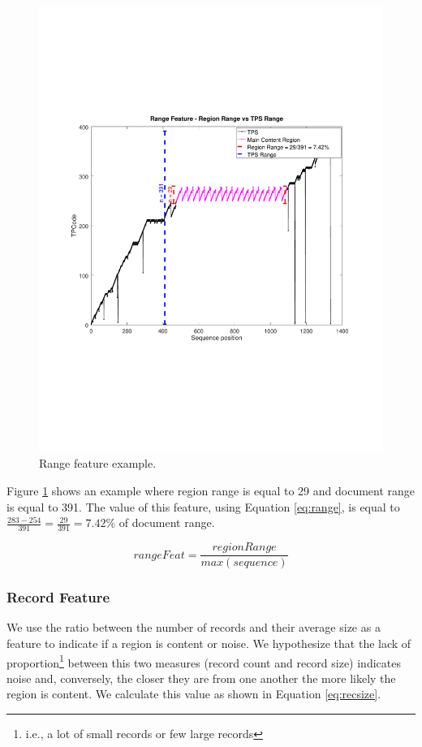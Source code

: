 \begin{figure}[h]
  \centering
     \includegraphics[trim={2.0cm 7.0cm 2.2cm 7.4cm}, clip,  width=\columnwidth]{img/range.pdf}
  \caption{Range feature example.}
  \label{fig:range}
\end{figure}

Figure \ref{fig:range} shows an example where region range is equal to 29 and
document range is equal to 391. The value of this feature, using Equation
\ref{eq:range}, is equal to $\frac{283-254}{391}=\frac{29}{391}=7.42\%$ of
document range.

\begin{equation}\label{eq:range}
    rangeFeat = \frac{regionRange}{max(sequence)}
\end{equation}

\subsubsection{Record Feature}\label{ss:rec}
We use the ratio between the number of records and their average size as a
feature to indicate if a region is content or noise. We hypothesize that the
lack of proportion\footnote{i.e., a lot of small records or few large records}
between this two measures (record count and record size) indicates noise and,
conversely, the closer they are from one another the more likely the region is
content. We calculate this value as shown in Equation \ref{eq:recsize}.

